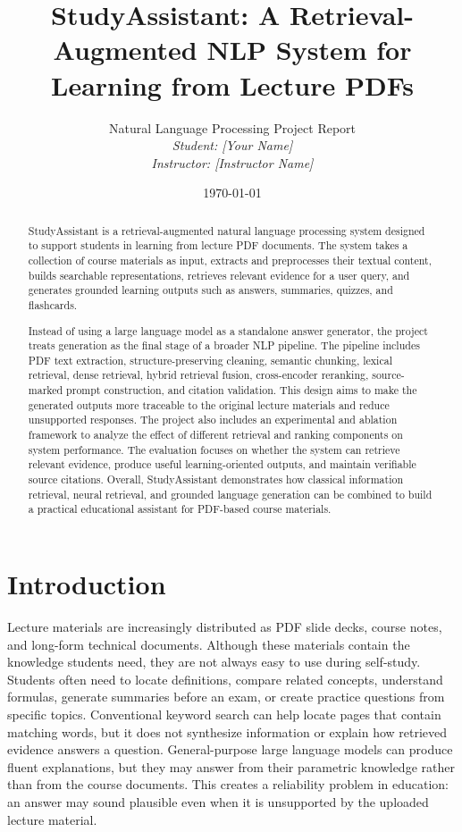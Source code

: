 \documentclass[11pt,a4paper]{article}
\title{\textbf{StudyAssistant: A Retrieval-Augmented NLP System for Learning from Lecture PDFs}}
\author{
    Natural Language Processing Project Report\\
    \textit{Student: [Your Name]}\\
    \textit{Instructor: [Instructor Name]}
}
\date{\today}
\begin{document}
\maketitle

\begin{abstract}

StudyAssistant is a retrieval-augmented natural language processing system
designed to support students in learning from lecture PDF documents. The system
takes a collection of course materials as input, extracts and preprocesses their
textual content, builds searchable representations, retrieves relevant evidence
for a user query, and generates grounded learning outputs such as answers,
summaries, quizzes, and flashcards.

Instead of using a large language model as a standalone answer generator, the
project treats generation as the final stage of a broader NLP pipeline. The
pipeline includes PDF text extraction, structure-preserving cleaning, semantic
chunking, lexical retrieval, dense retrieval, hybrid retrieval fusion,
cross-encoder reranking, source-marked prompt construction, and citation
validation. This design aims to make the generated outputs more traceable to
the original lecture materials and reduce unsupported responses.
The project also includes an experimental and ablation framework to analyze the
effect of different retrieval and ranking components on system performance.
The evaluation focuses on whether the system can retrieve relevant evidence,
produce useful learning-oriented outputs, and maintain verifiable source
citations. Overall, StudyAssistant demonstrates how classical information
retrieval, neural retrieval, and grounded language generation can be combined to
build a practical educational assistant for PDF-based course materials.
\end{abstract}

\tableofcontents
\newpage

\section{Introduction}

Lecture materials are increasingly distributed as PDF slide decks, course notes,
and long-form technical documents. Although these materials contain the
knowledge students need, they are not always easy to use during self-study.
Students often need to locate definitions, compare related concepts, understand
formulas, generate summaries before an exam, or create practice questions from
specific topics. Conventional keyword search can help locate pages that contain
matching words, but it does not synthesize information or explain how retrieved
evidence answers a question. General-purpose large language models can produce
fluent explanations, but they may answer from their parametric knowledge rather
than from the course documents. This creates a reliability problem in education:
an answer may sound plausible even when it is unsupported by the uploaded
lecture material.
\end{document}
